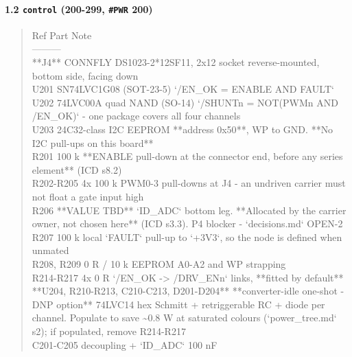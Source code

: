 \documentclass[11pt,a4paper]{article}
\begin{document}
\paragraph*{1.2 \texttt{control} (200-299, \texttt{\#PWR} 200)}
\begin{quote}\small\ttfamily\raggedright
\textbar{} Ref \textbar{} Part \textbar{} Note \textbar{}\\
\textbar{}---\textbar{}---\textbar{}---\textbar{}\\
\textbar{} {*}{*}J4{*}{*} \textbar{} CONNFLY DS1023-2{*}12SF11, 2x12 socket \textbar{} reverse-mounted, bottom side, facing down \textbar{}\\
\textbar{} U201 \textbar{} SN74LVC1G08 (SOT-23-5) \textbar{} `/EN\_OK = ENABLE AND FAULT` \textbar{}\\
\textbar{} U202 \textbar{} 74LVC00A quad NAND (SO-14) \textbar{} `/SHUNTn = NOT(PWMn AND /EN\_OK)` - one package covers all four channels \textbar{}\\
\textbar{} U203 \textbar{} 24C32-class I2C EEPROM \textbar{} {*}{*}address 0x50{*}{*}, WP to GND. {*}{*}No I2C pull-ups on this board{*}{*} \textbar{}\\
\textbar{} R201 \textbar{} 100 k \textbar{} {*}{*}ENABLE pull-down at the connector end, before any series element{*}{*} (ICD s8.2) \textbar{}\\
\textbar{} R202-R205 \textbar{} 4x 100 k \textbar{} PWM0-3 pull-downs at J4 - an undriven carrier must not float a gate input high \textbar{}\\
\textbar{} R206 \textbar{} {*}{*}VALUE TBD{*}{*} \textbar{} `ID\_ADC` bottom leg. {*}{*}Allocated by the carrier owner, not chosen here{*}{*} (ICD s3.3). P4 blocker - `decisions.md` OPEN-2 \textbar{}\\
\textbar{} R207 \textbar{} 100 k \textbar{} local `FAULT` pull-up to `+3V3`, so the node is defined when unmated \textbar{}\\
\textbar{} R208, R209 \textbar{} 0 R / 10 k \textbar{} EEPROM A0-A2 and WP strapping \textbar{}\\
\textbar{} R214-R217 \textbar{} 4x 0 R \textbar{} `/EN\_OK -\textgreater{} /DRV\_ENn` links, {*}{*}fitted by default{*}{*} \textbar{}\\
\textbar{} {*}{*}U204, R210-R213, C210-C213, D201-D204{*}{*} \textbar{} {*}{*}converter-idle one-shot - DNP option{*}{*} \textbar{} 74LVC14 hex Schmitt + retriggerable RC + diode per channel. Populate to save \textasciitilde{}0.8 W at saturated colours (`power\_tree.md` s2); if populated, remove R214-R217 \textbar{}\\
\textbar{} C201-C205 \textbar{} decoupling + `ID\_ADC` 100 nF \textbar{} \textbar{}
\end{quote}
\end{document}
